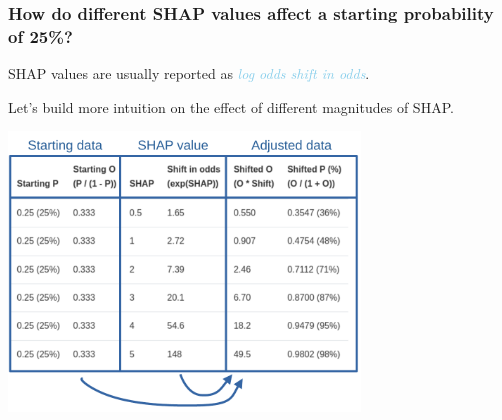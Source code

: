 \documentclass[xcolor={usenames,dvipsnames}]{beamer}
\begin{document}

\begin{frame}
\frametitle{How do different SHAP values affect a starting probability of 25\%?}


SHAP values are usually reported as \textcolor{SkyBlue}{\emph{log odds shift in odds}}. 


\vspace{0.5em}
Let’s build more intuition on the effect of different magnitudes of SHAP.

\begin{center}
\includegraphics[width=0.7\textwidth]{./images/SHAP_table}
\end{center} 

\end{frame}


\end{document}
